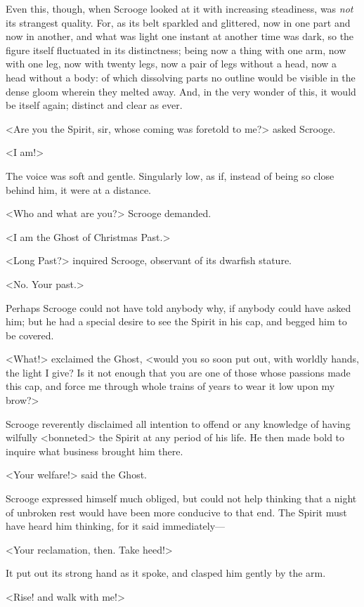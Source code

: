 Even this, though, when Scrooge looked at it with increasing steadiness, was \textit{not} its strangest quality. For, as its belt sparkled and glittered, now in one part and now in another, and what was light one instant at another time was dark, so the figure itself fluctuated in its distinctness; being now a thing with one arm, now with one leg, now with twenty legs, now a pair of legs without a head, now a head without a body: of which dissolving parts no outline would be visible in the dense gloom wherein they melted away. And, in the very wonder of this, it would be itself again; distinct and clear as ever.

<Are you the Spirit, sir, whose coming was foretold to me?> asked Scrooge.

<I am!>

The voice was soft and gentle. Singularly low, as if, instead of being so close behind him, it were at a distance.

<Who and what are you?> Scrooge demanded.

<I am the Ghost of Christmas Past.>

<Long Past?> inquired Scrooge, observant of its dwarfish stature.

<No. Your past.>

Perhaps Scrooge could not have told anybody why, if anybody could have asked him; but he had a special desire to see the Spirit in his cap, and begged him to be covered.

<What!> exclaimed the Ghost, <would you so soon put out, with worldly hands, the light I give? Is it not enough that you are one of those whose passions made this cap, and force me through whole trains of years to wear it low upon my brow?>

Scrooge reverently disclaimed all intention to offend or any knowledge of having wilfully <bonneted> the Spirit at any period of his life. He then made bold to inquire what business brought him there.

<Your welfare!> said the Ghost.

Scrooge expressed himself much obliged, but could not help thinking that a night of unbroken rest would have been more conducive to that end. The Spirit must have heard him thinking, for it said immediately— 

<Your reclamation, then. Take heed!>

It put out its strong hand as it spoke, and clasped him gently by the arm.

<Rise! and walk with me!>

